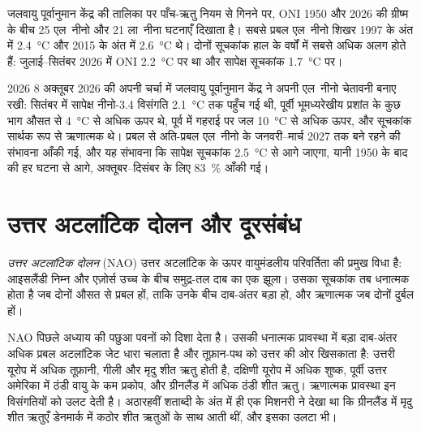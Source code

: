 जलवायु पूर्वानुमान केंद्र की तालिका पर पाँच-ऋतु नियम से गिनने पर, ONI 1950 और 2026 की ग्रीष्म के बीच 25
एल~नीनो और 21 ला~नीना घटनाएँ दिखाता है। सबसे प्रबल एल~नीनो
शिखर 1997 के अंत में \qty{2.4}{\celsius} और 2015 के अंत में \qty{2.6}{\celsius} थे। दोनों सूचकांक
हाल के वर्षों में सबसे अधिक अलग होते हैं: जुलाई--सितंबर 2026 में ONI \qty{2.2}{\celsius} पर था और
सापेक्ष सूचकांक \qty{1.7}{\celsius} पर।

\begin{dated}{2026}
8 अक्तूबर 2026 की अपनी चर्चा में जलवायु पूर्वानुमान केंद्र ने अपनी एल~नीनो चेतावनी बनाए रखी:
सितंबर में सापेक्ष नीनो-3.4 विसंगति \qty{+2.1}{\celsius} तक पहुँच गई थी, पूर्वी
भूमध्यरेखीय प्रशांत के कुछ भाग औसत से \qty{4}{\celsius} से अधिक ऊपर थे, पूर्व में गहराई पर जल
\qty{10}{\celsius} से अधिक ऊपर, और  सूचकांक सार्थक रूप से
ऋणात्मक थे।
प्रबल से अति-प्रबल एल~नीनो के जनवरी--मार्च 2027 तक बने रहने की संभावना आँकी गई, और यह संभावना कि
सापेक्ष सूचकांक \qty{2.5}{\celsius} से आगे जाएगा, यानी 1950 के बाद की हर घटना से आगे,
अक्तूबर--दिसंबर के लिए \qty{83}{\percent} आँकी गई।
\end{dated}

\section{उत्तर अटलांटिक दोलन और दूरसंबंध}\label{sec:b2:climate-variability:nao}

\begin{definition}[उत्तर अटलांटिक दोलन]\label{def:b2:climate-variability:nao}
\emph{उत्तर अटलांटिक दोलन} (NAO) उत्तर अटलांटिक के ऊपर वायुमंडलीय परिवर्तिता की
प्रमुख विधा है: आइसलैंडी निम्न और एज़ोर्स उच्च के बीच समुद्र-तल दाब का एक झूला।
उसका सूचकांक तब धनात्मक होता है जब दोनों औसत से प्रबल हों, ताकि
उनके बीच दाब-अंतर बड़ा हो, और ऋणात्मक जब दोनों दुर्बल हों।
\end{definition}

NAO पिछले अध्याय की पछुआ पवनों को दिशा देता है। उसकी धनात्मक प्रावस्था में बड़ा दाब-अंतर
अधिक प्रबल अटलांटिक जेट धारा चलाता है और तूफ़ान-पथ को उत्तर की ओर खिसकाता है: उत्तरी यूरोप में
अधिक तूफ़ानी, गीली और मृदु शीत ऋतु होती है, दक्षिणी यूरोप में अधिक शुष्क, पूर्वी उत्तर अमेरिका में
ठंडी वायु के कम प्रकोप, और ग्रीनलैंड में अधिक ठंडी शीत ऋतु। ऋणात्मक प्रावस्था इन
विसंगतियों को उलट देती है। अठारहवीं शताब्दी के अंत में ही एक मिशनरी ने देखा था कि ग्रीनलैंड में मृदु शीत ऋतुएँ
डेनमार्क में कठोर शीत ऋतुओं के साथ आती थीं, और इसका उलटा भी।

